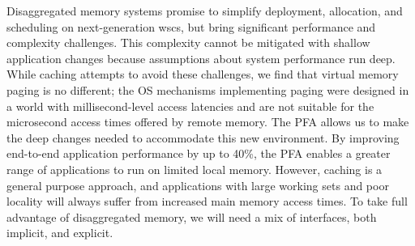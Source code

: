 Disaggregated memory systems promise to simplify deployment, allocation, and
scheduling on next-generation \glspl{wsc}, but bring significant performance
and complexity challenges. This complexity cannot be mitigated with shallow
application changes because assumptions about system performance run deep.
While caching attempts to avoid these challenges, we find that virtual memory
paging is no different; the OS mechanisms implementing paging were designed in
a world with millisecond-level access latencies and are not suitable for the
microsecond access times offered by remote memory. The PFA allows us to make
the deep changes needed to accommodate this new environment. By improving
end-to-end application performance by up to 40\%, the PFA enables a greater
range of applications to run on limited local memory. However, caching is a
general purpose approach, and applications with large working sets and poor
locality will always suffer from increased main memory access times. To take
full advantage of disaggregated memory, we will need a mix of interfaces, both
implicit, and explicit.


